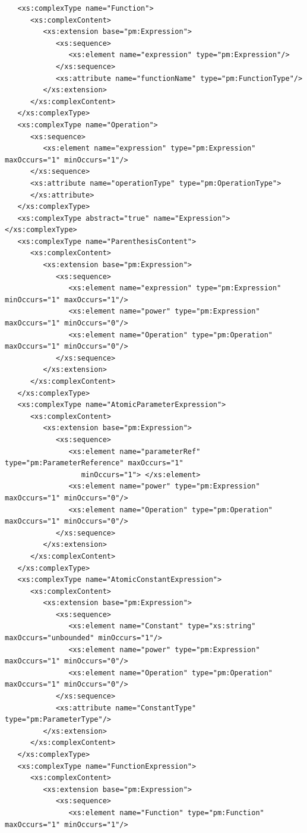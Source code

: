 \documentclass[a4paper,11pt] {ivoa}
\begin{document}
\begin{lstlisting}
   <xs:complexType name="Function">
      <xs:complexContent>
         <xs:extension base="pm:Expression">
            <xs:sequence>
               <xs:element name="expression" type="pm:Expression"/>
            </xs:sequence>
            <xs:attribute name="functionName" type="pm:FunctionType"/>
         </xs:extension>
      </xs:complexContent>
   </xs:complexType>
   <xs:complexType name="Operation">
      <xs:sequence>
         <xs:element name="expression" type="pm:Expression" maxOccurs="1" minOccurs="1"/>
      </xs:sequence>
      <xs:attribute name="operationType" type="pm:OperationType">
      </xs:attribute>
   </xs:complexType>
   <xs:complexType abstract="true" name="Expression"> </xs:complexType>
   <xs:complexType name="ParenthesisContent">
      <xs:complexContent>
         <xs:extension base="pm:Expression">
            <xs:sequence>
               <xs:element name="expression" type="pm:Expression" minOccurs="1" maxOccurs="1"/>
               <xs:element name="power" type="pm:Expression" maxOccurs="1" minOccurs="0"/>
               <xs:element name="Operation" type="pm:Operation" maxOccurs="1" minOccurs="0"/>
            </xs:sequence>
         </xs:extension>
      </xs:complexContent>
   </xs:complexType>
   <xs:complexType name="AtomicParameterExpression">
      <xs:complexContent>
         <xs:extension base="pm:Expression">
            <xs:sequence>
               <xs:element name="parameterRef" type="pm:ParameterReference" maxOccurs="1"
                  minOccurs="1"> </xs:element>
               <xs:element name="power" type="pm:Expression" maxOccurs="1" minOccurs="0"/>
               <xs:element name="Operation" type="pm:Operation" maxOccurs="1" minOccurs="0"/>
            </xs:sequence>
         </xs:extension>
      </xs:complexContent>
   </xs:complexType>
   <xs:complexType name="AtomicConstantExpression">
      <xs:complexContent>
         <xs:extension base="pm:Expression">
            <xs:sequence>
               <xs:element name="Constant" type="xs:string" maxOccurs="unbounded" minOccurs="1"/>
               <xs:element name="power" type="pm:Expression" maxOccurs="1" minOccurs="0"/>
               <xs:element name="Operation" type="pm:Operation" maxOccurs="1" minOccurs="0"/>
            </xs:sequence>
            <xs:attribute name="ConstantType" type="pm:ParameterType"/>
         </xs:extension>
      </xs:complexContent>
   </xs:complexType>
   <xs:complexType name="FunctionExpression">
      <xs:complexContent>
         <xs:extension base="pm:Expression">
            <xs:sequence>
               <xs:element name="Function" type="pm:Function" maxOccurs="1" minOccurs="1"/>

\end{lstlisting}
\end{document}
